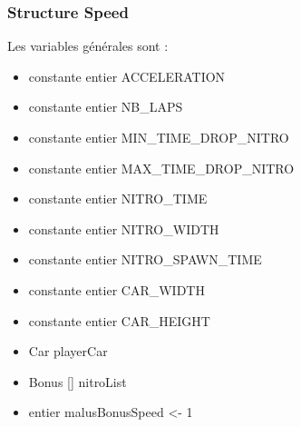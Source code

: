 \documentclass[11pt]{report}
\begin{document}
\subsubsection{Structure Speed}






Les variables générales sont : 

\begin{itemize}
  \item constante entier ACCELERATION
  \item constante entier NB\_LAPS
  \item constante entier MIN\_TIME\_DROP\_NITRO
  \item constante entier MAX\_TIME\_DROP\_NITRO
  \item constante entier NITRO\_TIME
  \item constante entier NITRO\_WIDTH
  \item constante entier NITRO\_SPAWN\_TIME
  \item constante entier CAR\_WIDTH
  \item constante entier CAR\_HEIGHT
  \item Car playerCar
  \item Bonus [] nitroList
  \item entier malusBonusSpeed <- 1
  \\
\end{itemize}
\end{document}
